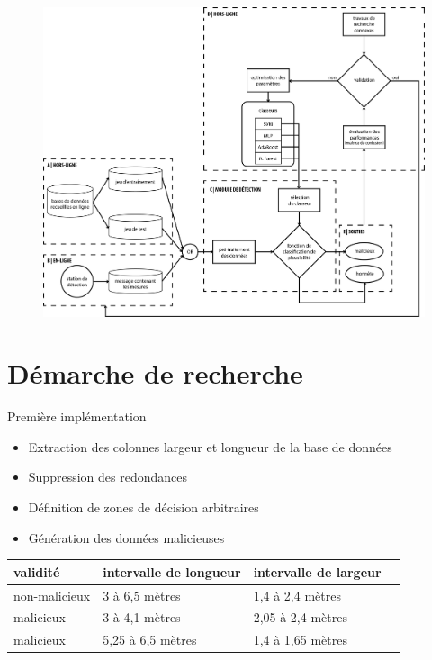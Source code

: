 \documentclass[usenames,dvipsnames]{beamer}
\begin{document}
\begin{frame}
\begin{figure}
\centering
\includegraphics[width=.9\textwidth]{img/structure.png}
\end{figure}
\end{frame}

\section{Démarche de recherche}

\begin{frame}{Première implémentation}
\begin{itemize}
\item Extraction des colonnes largeur et longueur de la base de données
\item Suppression des redondances
\item Définition de zones de décision arbitraires
\item Génération des données malicieuses
\end{itemize}
\begin{table}
\centering
\begin{tabular}{llll}
validité & intervalle de longueur & intervalle de largeur \\
\hline
non-malicieux & 3 à 6,5 mètres & 1,4 à 2,4 mètres \\
malicieux & 3 à 4,1 mètres & 2,05 à 2,4 mètres \\
malicieux & 5,25 à 6,5 mètres & 1,4 à 1,65 mètres \\
\end{tabular}
\end{table}
\end{frame}
\end{document}
